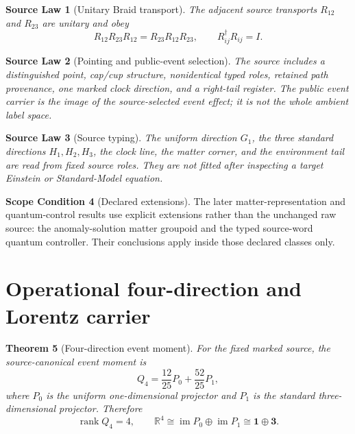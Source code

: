 \documentclass[11pt]{article}
\newtheorem{theorem}{Theorem}[section]
\newtheorem{law}[theorem]{Source Law}
\theoremstyle{definition}
\newtheorem{scope}[theorem]{Scope Condition}
\theoremstyle{remark}
\newcommand{\rank}{\operatorname{rank}}
\begin{document}
\begin{law}[Unitary Braid transport]
The adjacent source transports $R_{12}$ and $R_{23}$ are unitary and obey
\begin{equation}
R_{12}R_{23}R_{12}=R_{23}R_{12}R_{23},
\qquad R_{ij}^{\dagger}R_{ij}=I.
\label{eq:ybe}
\end{equation}
\end{law}

\begin{law}[Pointing and public-event selection]
The source includes a distinguished point, cap/cup structure, nonidentical typed roles, retained path provenance, one marked clock direction, and a right-tail register. The public event carrier is the image of the source-selected event effect; it is not the whole ambient label space.
\end{law}

\begin{law}[Source typing]
The uniform direction $G_1$, the three standard directions $H_1,H_2,H_3$, the clock line, the matter corner, and the environment tail are read from fixed source roles. They are not fitted after inspecting a target Einstein or Standard-Model equation.
\end{law}

\begin{scope}[Declared extensions]
The later matter-representation and quantum-control results use explicit extensions rather than the unchanged raw source: the anomaly-solution matter groupoid and the typed source-word quantum controller. Their conclusions apply inside those declared classes only.
\end{scope}

\section{Operational four-direction and Lorentz carrier}

\begin{theorem}[Four-direction event moment]
For the fixed marked source, the source-canonical event moment is
\begin{equation}
Q_4=\frac{12}{25}P_0+\frac{52}{25}P_1,
\label{eq:q4}
\end{equation}
where $P_0$ is the uniform one-dimensional projector and $P_1$ is the standard three-dimensional projector. Therefore
\begin{equation}
\rank Q_4=4,
\qquad
\mathbb R^4\cong\operatorname{im}P_0\oplus\operatorname{im}P_1
\cong \mathbf 1\oplus\mathbf 3.
\end{equation}
\end{theorem}
\end{document}
